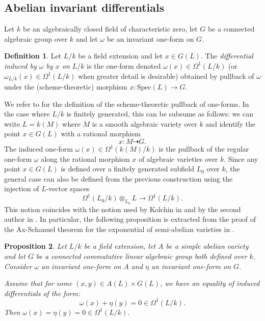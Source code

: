 \documentclass[12pt]{amsart}
\theoremstyle{definition}
\newtheorem{defn}{Definition}[section]
\theoremstyle{plain}
\newtheorem{Prop}[defn]{Proposition}
\theoremstyle{exampstyle}\newtheorem{thmx}{Theorem}
\theoremstyle{exampstyle}\newtheorem{thmxbis}{Theorem}
\begin{document}
\subsection{Abelian invariant differentials} Let $k$ be an algebraically closed field of characteristic zero, let $G$ be a connected algebraic group over $k$ and let $\omega$ be an invariant one-form on $G$. 

\begin{defn} 
Let $L/k$ be a field extension and let $x \in G(L)$. The {\em differential induced by $\omega$ by $x$ on $L/k$} is the one-form denoted $\omega(x) \in \Omega^1(L/k)$ (or $\omega_{L/k}(x) \in \Omega^1(L/k)$ when greater detail is desirable) obtained by pullback of $\omega$ under the (scheme-theoretic) morphism $x : \mathrm{Spec}(L) \rightarrow G.$ 
\end{defn}

We refer to \cite[Chapter II, Section 8]{Hartshorne} for the definition of the scheme-theoretic pullback of one-forms. In the case where $L/k$ is finitely generated, this can be subsume as follows: we can write $L = k(M)$ where $M$ is a smooth algebraic variety over $k$ and identify the point $x \in G(L)$ with a rational morphism 
$$ x : M \dashrightarrow G .$$
The induced one-form $\omega(x) \in \Omega^1(k(M)/k)$ is the pullback of the regular one-form $\omega$ along the rational morphism $x$ of algebraic varieties over $k$. Since any point $x \in G(L)$ is defined over a finitely generated subfield $L_0$ over $k$, the general case can also be defined from the previous construction using the injection of $L$-vector spaces
$$  \Omega^1(L_0/k) \otimes_{L_0} L \rightarrow \Omega^1(L/k).$$
This notion coincides with the notion used by Kolchin in \cite{Kolchin-abelian} and by the second author in \cite{Kirby-semiab}. In particular, the following proposition is extracted from the proof of the Ax-Schanuel theorem for the exponential of semi-abelian varieties in \cite{Kirby-semiab}.


\begin{Prop}\label{proposition-linear}
Let $L/k$ be a field extension, let $A$ be a simple abelian variety and let $G$ be a connected commutative linear algebraic group both defined over $k$. Consider $\omega$ an invariant one-form on $A$ and $\eta$ an invariant one-form on $G$.

 
Assume that for some $(x,y) \in A(L) \times G(L)$, we have an equality of induced differentials of the form:
$$ \omega(x) + \eta(y) = 0 \in \Omega^1(L/k).$$
Then $\omega(x) = \eta(y)= 0 \in \Omega^1(L/k).$ 
\end{Prop}
\end{document}
